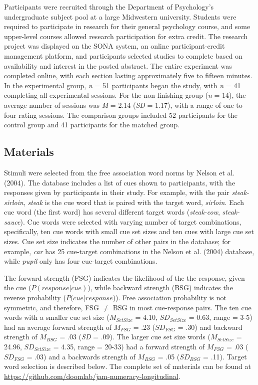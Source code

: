 \documentclass[
  man,floatsintext]{apa7}
\begin{document}
Participants were recruited through the Department of Psychology's
undergraduate subject pool at a large Midwestern university. Students
were required to participate in research for their general psychology
course, and some upper-level courses allowed research participation for
extra credit. The research project was displayed on the SONA system, an
online participant-credit management platform, and participants selected
studies to complete based on availability and interest in the posted
abstract. The entire experiment was completed online, with each section
lasting approximately five to fifteen minutes. In the experimental
group, \emph{n} = 51 participants began the study, with \emph{n} = 41
completing all experimental sessions. For the non-finishing group (\emph{n} =
14), the average number of sessions was \emph{M} = 2.14 (\emph{SD} = 1.17), with a
range of one to four rating sessions. The comparison groups included
52 participants for the control group and
41 participants for the matched group.

\subsection{Materials}\label{materials}

Stimuli were selected from the free association word norms by
Nelson et al. (2004). The database includes a list of cues shown to participants,
with the responses given by participants in their study. For example,
with the pair \emph{steak-sirloin}, \emph{steak} is the cue word that is paired
with the target word, \emph{sirloin}. Each cue word (the first word) has
several different target words (\emph{steak-cow}, \emph{steak-sauce}). Cue words
were selected with varying number of target combinations, specifically,
ten cue words with small cue set sizes and ten cues with large cue set
sizes. Cue set size indicates the number of other pairs in the database;
for example, \emph{car} has 25 cue-target combinations in the Nelson et al. (2004)
database, while \emph{pupil} only has four cue-target combinations.

The forward strength (FSG) indicates the likelihood of the the response,
given the cue (\(P(response|cue)\)), while backward strength (BSG)
indicates the reverse probability (\(P(cue|response\))). Free association
probability is not symmetric, and therefore, FSG \(\ne\) BSG in most
cue-response pairs. The ten cue words with a smaller cue set size
(\(M_{Set Size}\) = 4.10, \(SD_{Set Size}\) =
0.63, range = 3-5) had an average forward strength
of \(M_{FSG}\) = .23 (\(SD_{FSG}\) =
.30) and backward strength of \(M_{BSG}\) =
.03 (\emph{SD} =
.09). The larger cue set size words
(\(M_{Set Size}\) = 24.96, \(SD_{Set Size}\) =
4.35, range = 20-33) had a forward strength of
\(M_{FSG}\) = .03 (\(SD_{FSG}\) =
.03) and a backwards strength of \(M_{BSG}\)
= .05 (\(SD_{BSG}\) =
.11). Target word selection is described
below. The complete set of materials can be found at
\url{https://github.com/doomlab/jam-numeracy-longitudinal}.
\end{document}
